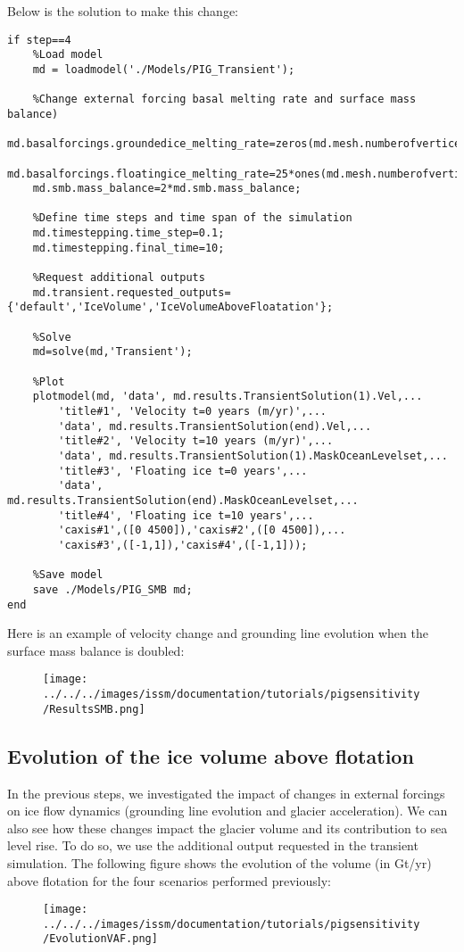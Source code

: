 Below is the solution to make this change:
\begin{verbatim}if step==4
	%Load model
	md = loadmodel('./Models/PIG_Transient');

	%Change external forcing basal melting rate and surface mass balance)
	md.basalforcings.groundedice_melting_rate=zeros(md.mesh.numberofvertices,1);
	md.basalforcings.floatingice_melting_rate=25*ones(md.mesh.numberofvertices,1);
	md.smb.mass_balance=2*md.smb.mass_balance;

	%Define time steps and time span of the simulation
	md.timestepping.time_step=0.1;
	md.timestepping.final_time=10;

	%Request additional outputs
	md.transient.requested_outputs={'default','IceVolume','IceVolumeAboveFloatation'};

	%Solve
	md=solve(md,'Transient');

	%Plot
	plotmodel(md, 'data', md.results.TransientSolution(1).Vel,...
		'title#1', 'Velocity t=0 years (m/yr)',...
		'data', md.results.TransientSolution(end).Vel,...
		'title#2', 'Velocity t=10 years (m/yr)',...
		'data', md.results.TransientSolution(1).MaskOceanLevelset,...
		'title#3', 'Floating ice t=0 years',...
		'data', md.results.TransientSolution(end).MaskOceanLevelset,...
		'title#4', 'Floating ice t=10 years',...
		'caxis#1',([0 4500]),'caxis#2',([0 4500]),...
		'caxis#3',([-1,1]),'caxis#4',([-1,1]));

	%Save model
	save ./Models/PIG_SMB md;
end\end{verbatim}

Here is an example of velocity change and grounding line evolution when the surface mass balance is doubled:
\begin{figure}[H]
	\begin{center}
		\texttt{[image: ../../../images/issm/documentation/tutorials/pigsensitivity/ResultsSMB.png]}
	\end{center}
\end{figure}
\subsection{Evolution of the ice volume above flotation} %
In the previous steps, we investigated the impact of changes in external forcings on ice flow dynamics (grounding line evolution and glacier acceleration). We can also see how these changes impact the glacier volume and its contribution to sea level rise. To do so, we use the additional output \verb@IceVolumeAboveFloatation@ requested in the transient simulation. The following figure shows the evolution of the volume (in Gt/yr) above flotation for the four scenarios performed previously:
\begin{figure}[H]
	\begin{center}
		\texttt{[image: ../../../images/issm/documentation/tutorials/pigsensitivity/EvolutionVAF.png]}
	\end{center}
\end{figure}
